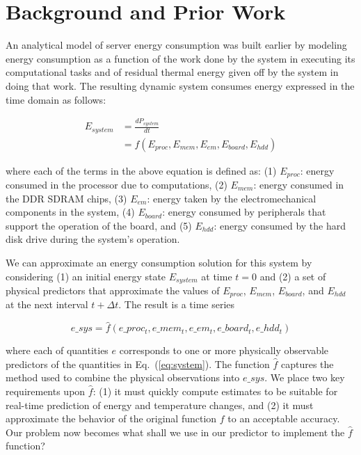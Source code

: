 \documentclass[times,10pt,finalversion]{usetex-v1}
\begin{document}
\section{Background and Prior Work}
\label{sec:priorwork}
An analytical model of server energy consumption was built earlier
\cite{Lewis2008} by modeling energy consumption as a function of the
work done by the system in executing its computational tasks and of
residual thermal energy given off by the system in doing that work.  The
resulting dynamic system consumes energy expressed in the time domain as
follows:
\begin{small}
\begin{align}
  \label{eq:system}
  E_{system}&=\frac{d{P_{system}}}{d{t}}\nonumber\\
           &=f(E_{proc},E_{mem},E_{em},E_{board},E_{hdd})
\end{align}
\end{small}
where each of the terms in the above equation is defined as: (1)
$E_{proc}$: energy consumed in the processor due to computations, (2)
$E_{mem}$: energy consumed in the DDR SDRAM chips, (3) $E_{em}$: energy taken by the
electromechanical components in the system, (4) $E_{board}$:
energy consumed by peripherals that support the operation of the board,
and (5) $E_{hdd}$: energy consumed by the hard disk
drive during the system's operation.

We can approximate an energy consumption solution for this system by
considering (1) an initial energy state $E_{system}$ at time $t=0$ and
(2) a set of physical predictors that approximate the values of
$E_{proc}$, $E_{mem}$, $E_{board}$, and $E_{hdd}$ at the next interval
$t+\Delta t$.  The result is a time series
{\setlength{\abovedisplayskip}{0pt plus 0pt minus 0pt}
 \setlength{\belowdisplayskip}{0pt plus 0pt minus 0pt}
\begin{small}
\begin{equation}
\label{eq:tseries}
e\_sys=\hat{f}(e\_proc_{t},e\_mem_{t},e\_em_{t},e\_board_{t},e\_hdd_{t})
\end{equation}
\end{small}}
where each of quantities $e$ corresponds to one or more physically
observable predictors of the quantities in Eq.~(\ref{eq:system}). The
function $\hat{f}$ captures the method used to combine the physical
observations into $e\_sys$.  We place two key requirements upon
$\hat{f}$: (1) it must quickly compute estimates to be suitable for
real-time prediction of energy and temperature changes, and (2) it must
approximate the behavior of the original function $f$ to an acceptable
accuracy.  Our problem now becomes what shall we use in our predictor to
implement the $\hat{f}$ function?
\end{document}
